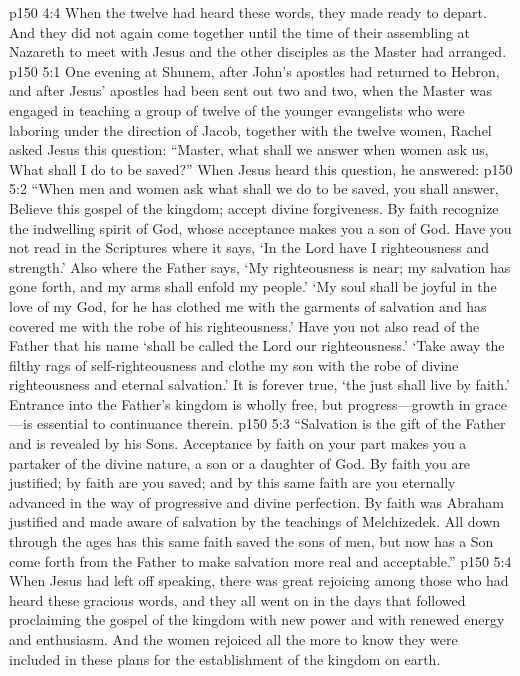 \vs p150 4:4 When the twelve had heard these words, they made ready to depart. And they did not again come together until the time of their assembling at Nazareth to meet with Jesus and the other disciples as the Master had arranged.
\vs p150 5:1 One evening at Shunem, after John’s apostles had returned to Hebron, and after Jesus’ apostles had been sent out two and two, when the Master was engaged in teaching a group of twelve of the younger evangelists who were laboring under the direction of Jacob, together with the twelve women, Rachel asked Jesus this question: “Master, what shall we answer when women ask us, What shall I do to be saved?” When Jesus heard this question, he answered:
\pc \vs p150 5:2 \textcolor{ubdarkred}{“When men and women ask what shall we do to be saved, you shall answer, Believe this gospel of the kingdom; accept divine forgiveness. By faith recognize the indwelling spirit of God, whose acceptance makes you a son of God. Have you not read in the Scriptures where it says, ‘In the Lord have I righteousness and strength.’ Also where the Father says, ‘My righteousness is near; my salvation has gone forth, and my arms shall enfold my people.’ ‘My soul shall be joyful in the love of my God, for he has clothed me with the garments of salvation and has covered me with the robe of his righteousness.’ Have you not also read of the Father that his name ‘shall be called the Lord our righteousness.’ ‘Take away the filthy rags of self\hyp{}righteousness and clothe my son with the robe of divine righteousness and eternal salvation.’ It is forever true, ‘the just shall live by faith.’ Entrance into the Father’s kingdom is wholly free, but progress---growth in grace---is essential to continuance therein.}
\vs p150 5:3 \textcolor{ubdarkred}{“Salvation is the gift of the Father and is revealed by his Sons. Acceptance by faith on your part makes you a partaker of the divine nature, a son or a daughter of God. By faith you are justified; by faith are you saved; and by this same faith are you eternally advanced in the way of progressive and divine perfection. By faith was Abraham justified and made aware of salvation by the teachings of Melchizedek. All down through the ages has this same faith saved the sons of men, but now has a Son come forth from the Father to make salvation more real and acceptable.”}
\pc \vs p150 5:4 When Jesus had left off speaking, there was great rejoicing among those who had heard these gracious words, and they all went on in the days that followed proclaiming the gospel of the kingdom with new power and with renewed energy and enthusiasm. And the women rejoiced all the more to know they were included in these plans for the establishment of the kingdom on earth.

